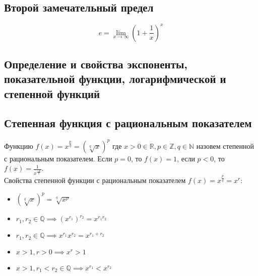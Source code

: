 \documentclass{article}
\begin{document}
        
    \newpage
    
    \section{}
    \subsection*{Второй замечательный предел}
        \[ e = \lim_{x \to \infty} {\left( 1 + \frac{1}{x} \right)}^x \]


    \subsection*{Определение и свойства экспоненты, показательной функции, логарифмической и степенной функций}
        \subsection*{Степенная функция с рациональным показателем}
        Функцию $f(x) = x^{\frac{p}{q}} = \left( \sqrt[q]{x} \right)^p $ где $x > 0 \in \mathbb{R}, p \in \mathbb{Z}, q \in \mathbb{N}$ назовем степенной с рациональным показателем.
        Если $p = 0$, то $f(x) = 1$, если $p < 0$, то $f(x) = \frac{1}{x^{\frac{-p}{q}}}$.
        \\
        Свойства степенной функции с рациональным показателем $f(x) = x^{\frac{p}{q}} = x^r$:
        \begin{itemize}
            \item $ \left( \sqrt[q]{x} \right)^p = \sqrt[q]{x^p} $
            \item $ r_1, r_2 \in \mathbb{Q} \implies {\left( x^{r_1} \right)}^{r_2} = x^{r_1r_2} $
            \item $ r_1, r_2 \in \mathbb{Q} \implies x^{r_1}x^{r_2} = x^{r_1 + r_2} $
            \item $ x > 1, r > 0 \implies x^r > 1 $
            \item $ x > 1, r_1 < r_2 \in \mathbb{Q} \implies x^{r_1} < x^{r_2}$
        \end{itemize}
        
\end{document}
